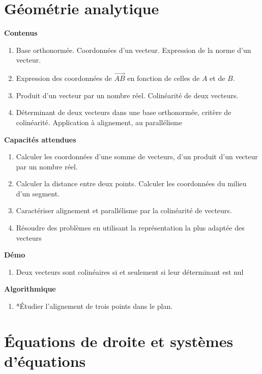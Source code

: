 \documentclass[10pt,a4paper]{article}
\begin{document}
\section{Géométrie analytique}

\textbf{Contenus}

\begin{enumerate}
\item Base orthonormée. Coordonnées d’un vecteur. Expression de la norme d’un vecteur.
\item Expression des coordonnées de $\overrightarrow{AB}$ en fonction de celles de $A$ et de $B$.
\item Produit d’un vecteur par un nombre réel. Colinéarité de deux vecteurs.
\item Déterminant de deux vecteurs dans une base orthonormée, critère de colinéarité. 
Application à alignement, au parallélisme
\end{enumerate}

\textbf{Capacités attendues}
 
\begin{enumerate}
\item Calculer les coordonnées d'une somme de vecteurs, d'un produit d'un vecteur par un nombre réel.
\item Calculer la distance entre deux points. Calculer les coordonnées du milieu d'un segment.
\item Caractériser alignement et parallélisme par la colinéarité de vecteurs.
\item  Résoudre des problèmes en utilisant la représentation la plus adaptée des vecteurs
\end{enumerate}

\textbf{Démo}

\begin{enumerate}
\item Deux vecteurs sont colinéaires si et seulement si leur déterminant est nul
\end{enumerate}

 
\textbf{Algorithmique}

\begin{enumerate}
\item *Étudier l'alignement de trois points dans le plan.
\end{enumerate}

 

\section{Équations de droite et systèmes d'équations}
\end{document}
